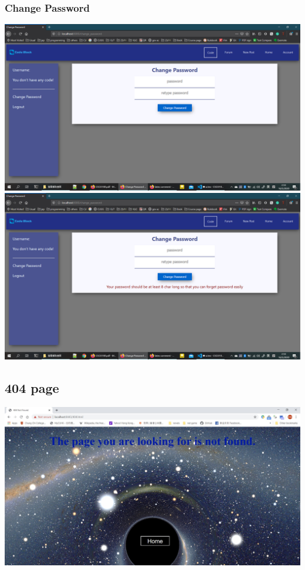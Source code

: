 \subsubsection{Change Password}
\includegraphics[scale=0.45]{Doc/Pics/change_pw_no_msg.png}
\includegraphics[scale=0.45]{Doc/Pics/change_pw_msg.png}

\subsection{404 page}
\includegraphics[scale=0.45]{Doc/Pics/404.jpg}

